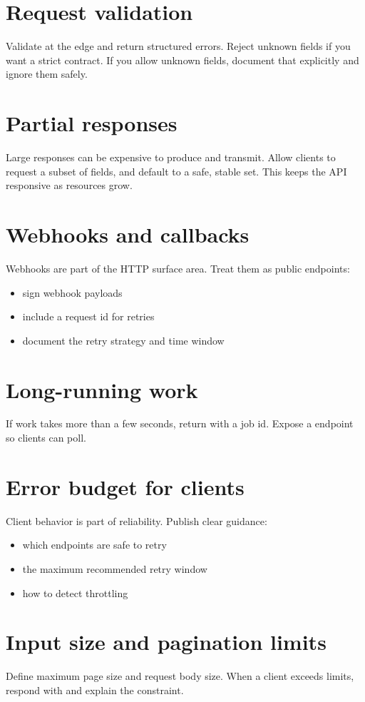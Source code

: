 \section{Request validation}
Validate at the edge and return structured errors.
Reject unknown fields if you want a strict contract.
If you allow unknown fields, document that explicitly and ignore them safely.

\section{Partial responses}
Large responses can be expensive to produce and transmit.
Allow clients to request a subset of fields, and default to a safe, stable set.
This keeps the API responsive as resources grow.

\section{Webhooks and callbacks}
Webhooks are part of the HTTP surface area.
Treat them as public endpoints:
\begin{itemize}[nosep]
  \item sign webhook payloads
  \item include a request id for retries
  \item document the retry strategy and time window
\end{itemize}

\section{Long-running work}
If work takes more than a few seconds, return  with a job id.
Expose a  endpoint so clients can poll.

\section{Error budget for clients}
Client behavior is part of reliability.
Publish clear guidance:
\begin{itemize}[nosep]
  \item which endpoints are safe to retry
  \item the maximum recommended retry window
  \item how to detect throttling
\end{itemize}

\section{Input size and pagination limits}
Define maximum page size and request body size.
When a client exceeds limits, respond with  and explain the constraint.

